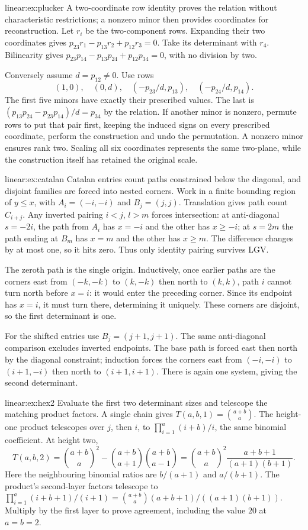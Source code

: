 \begin{solution}{linear:ex:plucker}
\idea A two-coordinate row identity proves the relation without characteristic restrictions; a nonzero minor then provides coordinates for reconstruction.
\writeup Let $r_i$ be the two-component rows. Expanding their two coordinates gives $p_{23}r_1-p_{13}r_2+p_{12}r_3=0$. Take its determinant with $r_4$. Bilinearity gives $p_{23}p_{14}-p_{13}p_{24}+p_{12}p_{34}=0$, with no division by two.

Conversely assume $d=p_{12}\ne0$. Use rows
\[(1,0),\quad(0,d),\quad(-p_{23}/d,p_{13}),\quad(-p_{24}/d,p_{14}).\]
The first five minors have exactly their prescribed values. The last is $(p_{13}p_{24}-p_{23}p_{14})/d=p_{34}$ by the relation. If another minor is nonzero, permute rows to put that pair first, keeping the induced signs on every prescribed coordinate, perform the construction and undo the permutation. A nonzero minor ensures rank two. Scaling all six coordinates represents the same two-plane, while the construction itself has retained the original scale.
\end{solution}
\begin{solution}{linear:ex:catalan}
\idea Catalan entries count paths constrained below the diagonal, and disjoint families are forced into nested corners.
\writeup Work in a finite bounding region of $y\le x$, with $A_i=(-i,-i)$ and $B_j=(j,j)$. Translation gives path count $C_{i+j}$. Any inverted pairing $i<j$, $l>m$ forces intersection: at anti-diagonal $s=-2i$, the path from $A_i$ has $x=-i$ and the other has $x\ge-i$; at $s=2m$ the path ending at $B_m$ has $x=m$ and the other has $x\ge m$. The difference changes by at most one, so it hits zero. Thus only identity pairing survives LGV.

The zeroth path is the single origin. Inductively, once earlier paths are the corners east from $(-k,-k)$ to $(k,-k)$ then north to $(k,k)$, path $i$ cannot turn north before $x=i$: it would enter the preceding corner. Since its endpoint has $x=i$, it must turn there, determining it uniquely. These corners are disjoint, so the first determinant is one.

For the shifted entries use $B_j=(j+1,j+1)$. The same anti-diagonal comparison excludes inverted endpoints. The base path is forced east then north by the diagonal constraint; induction forces the corners east from $(-i,-i)$ to $(i+1,-i)$ then north to $(i+1,i+1)$. There is again one system, giving the second determinant.
\end{solution}
\begin{solution}{linear:ex:hex2}
\idea Evaluate the first two determinant sizes and telescope the matching product factors.
\writeup A single chain gives $T(a,b,1)=\binom{a+b}a$. The height-one product telescopes over $j$, then $i$, to $\prod_{i=1}^a(i+b)/i$, the same binomial coefficient. At height two,
\[T(a,b,2)=\binom{a+b}a^2-\binom{a+b}{a+1}\binom{a+b}{a-1}
 =\binom{a+b}a^2\frac{a+b+1}{(a+1)(b+1)}.
\]
Here the neighbouring binomial ratios are $b/(a+1)$ and $a/(b+1)$. The product's second-layer factors telescope to $\prod_{i=1}^a(i+b+1)/(i+1)=\binom{a+b}a(a+b+1)/((a+1)(b+1))$. Multiply by the first layer to prove agreement, including the value $20$ at $a=b=2$.
\end{solution}
